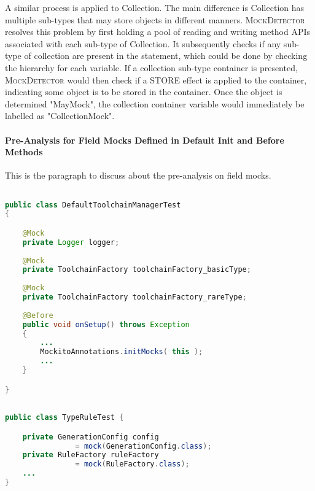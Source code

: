 A similar process is applied to Collection. The main difference is Collection has multiple sub-types that may store objects in different manners. \textsc{MockDetector} resolves this problem by first holding a pool of reading and writing method APIs associated with each sub-type of Collection. It subsequently checks if any sub-type of collection are present in the statement, which could be done by checking the hierarchy for each variable. If a collection sub-type container is presented, \textsc{MockDetector} would then check if a STORE effect is applied to the container, indicating some object is to be stored in the container. Once the object is determined "MayMock", the collection container variable would immediately be labelled as "CollectionMock".\\

\paragraph{Pre-Analysis for Field Mocks Defined in Default Init and Before Methods}
\label{subsubsec:pre-analysis} This is the paragraph to discuss about the pre-analysis on field mocks.


\begin{lstlisting}[basicstyle=\ttfamily, caption={Example for Annotated field mocks from \texttt{DefaultToolchainManagerTest.java} in maven-core.},
basicstyle=\scriptsize\ttfamily,language = Java, framesep=4.5mm,
framexleftmargin=1mm, captionpos=b, xleftmargin=3.5ex, label=lis:annotatedMock]

public class DefaultToolchainManagerTest
{

	@Mock
	private Logger logger;
	
	@Mock
	private ToolchainFactory toolchainFactory_basicType;
	
	@Mock
	private ToolchainFactory toolchainFactory_rareType;
	
	@Before
	public void onSetup() throws Exception
	{	
		...
		MockitoAnnotations.initMocks( this );
		...
	}

}

\end{lstlisting}

\begin{lstlisting}[basicstyle=\ttfamily, caption={Example for field mocks defined in <init> from \texttt{TypeRuleTest.java} in jsonschema2pojo.},
basicstyle=\scriptsize\ttfamily,language = Java, framesep=4.5mm,
framexleftmargin=1mm, captionpos=b, xleftmargin=3.5ex, label=lis:fieldMock]

public class TypeRuleTest {

	private GenerationConfig config 
				= mock(GenerationConfig.class);
	private RuleFactory ruleFactory 
				= mock(RuleFactory.class);
	...
}

\end{lstlisting}

